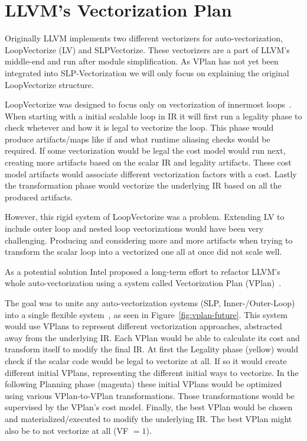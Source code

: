 \documentclass[sigplan,11pt,nonacm]{acmart}
\begin{document}
\section{LLVM's Vectorization Plan}
\label{sec:vplan}
Originally LLVM implements two different vectorizers for auto-vectorization, LoopVectorize (LV)
and SLPVectorize. These vectorizers are a part of LLVM's middle-end and run after module 
simplification. As VPlan has not yet been integrated into SLP-Vectorization we will only focus on
explaining the original LoopVectorize structure.

LoopVectorize was designed to focus only on vectorization of innermost loops~\cite{llvmintrvplan}. 
When starting with a initial scalable loop in IR it will first run a legality phase to check 
whetever and how it is legal to vectorize the loop. This phase would produce artifacts/maps like if 
and what runtime aliasing checks would be required. If some vectorization would be legal the 
cost model would run next, creating more artifacts based on the scalar IR and legality artifacts. 
These cost model artifacts would associate different vectorization factors with a cost.
Lastly the transformation phase would vectorize the underlying IR based on all the produced 
artifacts.

However, this rigid system of LoopVectorize was a problem. Extending LV to include outer loop 
and nested loop vectorizations would have been very challenging. Producing and considering more and 
more artifacts when trying to transform the scalar loop into a vectorized one all at once did not 
scale well.

As a potential solution Intel proposed a long-term effort to refactor LLVM's whole auto-vectorization
using a system called Vectorization Plan (VPlan)~\cite{llvmextloopvec}.

The goal was to unite any auto-vectorization systems (SLP, Inner-/Outer-Loop) into a single flexible
system~\cite{llvmintrvplan,llvmvplanstate}, as seen in Figure~\ref{fig:vplan-future}. This system would use VPlans to represent different 
vectorization approaches, abstracted away from the underlying IR. Each VPlan would be able to 
calculate its cost and transform itself to modify the final IR. At first the Legality 
phase (yellow) would check if the scalar code would be legal to vectorize at all. If so it would 
create different initial VPlans, representing the different initial ways to vectorize. In the 
following Planning phase (magenta) these initial VPlans would be optimized using various 
VPlan-to-VPlan transformations. Those transformations would be supervised by the VPlan's cost model.
Finally, the best VPlan would be chosen and materialized/executed to modify the underlying IR.
The best VPlan might also be to not vectorize at all (VF $=1$).
\end{document}
